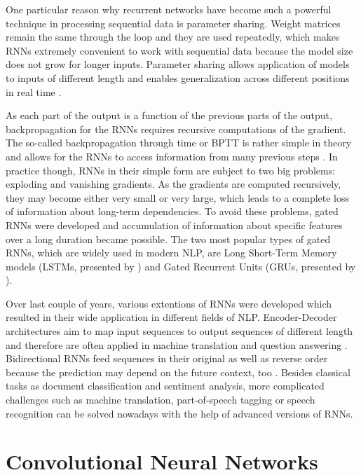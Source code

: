 \documentclass[]{krantz}
\begin{document}
One particular reason why recurrent networks have become such a powerful technique in processing sequential data is parameter sharing. Weight matrices remain the same through the loop and they are used repeatedly, which makes RNNs extremely convenient to work with sequential data because the model size does not grow for longer inputs. Parameter sharing allows application of models to inputs of different length and enables generalization across different positions in real time \citep{goodfellow2016deep}.

As each part of the output is a function of the previous parts of the output, backpropagation for the RNNs requires recursive computations of the gradient. The so-called backpropagation through time or BPTT is rather simple in theory and allows for the RNNs to access information from many previous steps \citep{boden2002guide}. In practice though, RNNs in their simple form are subject to two big problems: exploding and vanishing gradients. As the gradients are computed recursively, they may become either very small or very large, which leads to a complete loss of information about long-term dependencies. To avoid these problems, gated RNNs were developed and accumulation of information about specific features over a long duration became possible. The two most popular types of gated RNNs, which are widely used in modern NLP, are Long Short-Term Memory models (LSTMs, presented by \citet{hochreiter1997long}) and Gated Recurrent Units (GRUs, presented by \citet{cho2014learning}).

Over last couple of years, various extentions of RNNs were developed which resulted in their wide application in different fields of NLP. Encoder-Decoder architectures aim to map input sequences to output sequences of different length and therefore are often applied in machine translation and question answering \citep{sutskever2014sequence}. Bidirectional RNNs feed sequences in their original as well as reverse order because the prediction may depend on the future context, too \citep{schuster1997bidirectional}. Besides classical tasks as document classification and sentiment analysis, more complicated challenges such as machine translation, part-of-speech tagging or speech recognition can be solved nowadays with the help of advanced versions of RNNs.

\hypertarget{convolutional-neural-networks}{%
\section{Convolutional Neural Networks}\label{convolutional-neural-networks}}
\end{document}
